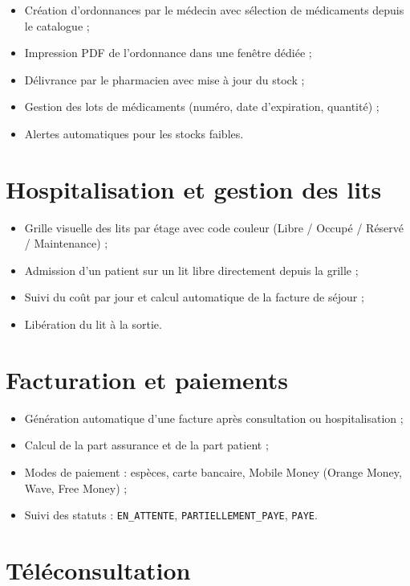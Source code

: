 \documentclass[12pt, a4paper]{report}
\begin{document}
\begin{itemize}
  \item Création d'ordonnances par le médecin avec sélection de médicaments
        depuis le catalogue ;
  \item Impression PDF de l'ordonnance dans une fenêtre dédiée ;
  \item Délivrance par le pharmacien avec mise à jour du stock ;
  \item Gestion des lots de médicaments (numéro, date d'expiration, quantité) ;
  \item Alertes automatiques pour les stocks faibles.
\end{itemize}

\section{Hospitalisation et gestion des lits}

\begin{itemize}
  \item Grille visuelle des lits par étage avec code couleur (Libre / Occupé /
        Réservé / Maintenance) ;
  \item Admission d'un patient sur un lit libre directement depuis la grille ;
  \item Suivi du coût par jour et calcul automatique de la facture de séjour ;
  \item Libération du lit à la sortie.
\end{itemize}

\section{Facturation et paiements}

\begin{itemize}
  \item Génération automatique d'une facture après consultation ou hospitalisation ;
  \item Calcul de la part assurance et de la part patient ;
  \item Modes de paiement : espèces, carte bancaire, Mobile Money
        (Orange Money, Wave, Free Money) ;
  \item Suivi des statuts : \texttt{EN\_ATTENTE}, \texttt{PARTIELLEMENT\_PAYE},
        \texttt{PAYE}.
\end{itemize}

\section{Téléconsultation}
\end{document}
